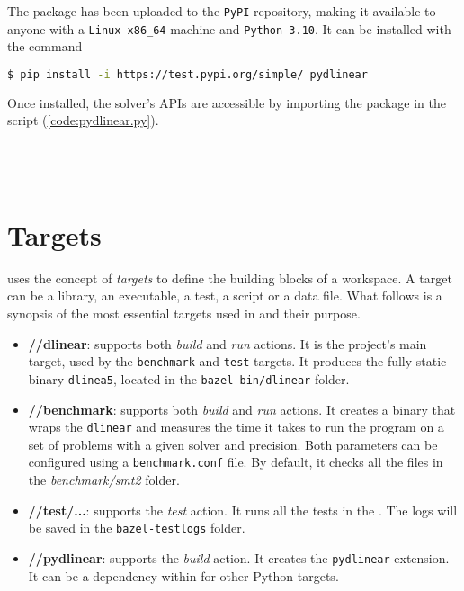 The package has been uploaded to the \texttt{PyPI} repository, making it available to anyone with a \texttt{Linux x86\_64} machine and \texttt{Python 3.10}.
It can be installed with the command

\begin{lstlisting}[language=bash,frame=single,showstringspaces=false]
$ pip install -i https://test.pypi.org/simple/ pydlinear
\end{lstlisting}
Once installed, the solver's APIs are accessible by importing the \pydlinear package in the script (\autoref{code:pydlinear.py}). \\ \\ \\ \\



\section{Targets}

\bazel uses the concept of \textit{targets} to define the building blocks of a workspace.
A target can be a library, an executable, a test, a script or a data file.
What follows is a synopsis of the most essential targets used in \dlinear and their purpose.

\begin{itemize}
        \item \textbf{//dlinear}: supports both \textit{build} and \textit{run} actions.
              It is the project's main target, used by the \texttt{benchmark} and \texttt{test} targets.
              It produces the fully static binary \texttt{dlinea5}, located in the \texttt{bazel-bin/dlinear} folder.
        \item \textbf{//benchmark}: supports both \textit{build} and \textit{run} actions.
              It creates a binary that wraps the \texttt{dlinear} and measures the time it takes to run the program on a set of problems with a given solver and precision.
              Both parameters can be configured using a \texttt{benchmark.conf} file.
              By default, it checks all the files in the \textit{benchmark/smt2} folder.
        \item \textbf{//test/...}: supports the \textit{test} action.
              It runs all the tests in the \dlinear.
              The logs will be saved in the \texttt{bazel-testlogs} folder.
        \item \textbf{//pydlinear}: supports the \textit{build} action.
              It creates the \texttt{pydlinear} extension.
              It can be a dependency within \bazel for other Python targets.
\end{itemize}
